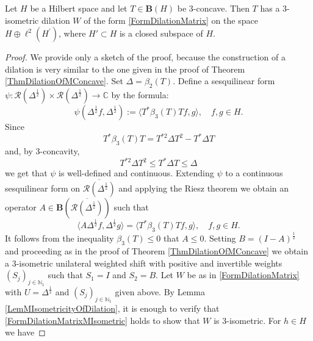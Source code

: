 \documentclass[10pt,a4paper]{amsart}
\renewcommand{\le}{\leqslant}
\begin{document}
\begin{theorem}
    \label{ThmDilationOf3ConcaveWithoutExpansivity}
    Let $ H $ be a Hilbert space and let $ T\in \mathbf{B}(H) $ be $ 3 $-concave. Then $ T $ has a $ 3 $-isometric dilation $ W $ of the form \eqref{FormDilationMatrix} on the space $ H\oplus \ell^{2}(H^{\prime}) $, where $ H' \subset H $ is a closed subspace of $ H $.
\end{theorem}

\begin{proof}
    We provide only a sketch of the proof, because the construction of a dilation is very similar to the one given in the proof of Theorem \ref{ThmDilationOfMConcave}. Set $ \Delta = \beta_{2}(T) $. Define a sesquilinear form $ \psi\colon \mathcal{R}(\Delta^{\frac{1}{2}})\times \mathcal{R}(\Delta^{\frac{1}{2}}) \to \mathbb{C} $ by the formula:
    \begin{equation*}
        \psi(\Delta^{\frac{1}{2}}f,\Delta^{\frac{1}{2}}):= \langle T^{\ast}\beta_{3}(T)Tf,g\rangle, \quad f,g\in H.
    \end{equation*}
    Since
    \begin{equation*}
        T^{\ast}\beta_{3}(T)T = T^{\ast 2}\Delta T^{2} - T^{\ast}\Delta T
    \end{equation*}
    and, by 3-concavity,
    \begin{equation*}
        T^{\ast 2}\Delta T^{2} \le T^{\ast }\Delta T \le \Delta
    \end{equation*}
    we get that $ \psi $ is well-defined and continuous.  Extending $ \psi $ to a continuous sesquilinear form on $ \overline{\mathcal{R}(\Delta^{\frac{1}{2}})} $ and applying the Riesz theorem we obtain an operator $ A\in \mathbf{B}(\overline{\mathcal{R}(\Delta^{\frac{1}{2}})}) $ such that
    \begin{equation}
        \langle A\Delta^{\frac{1}{2}}f,\Delta^{\frac{1}{2}}g\rangle = \langle T^{\ast}\beta_{3}(T)Tf,g\rangle, \quad f,g\in H.
    \end{equation}
    It follows from the inequality $ \beta_{3}(T)\le 0 $ that $ A\le 0 $. Setting $ B = (I-A)^{\frac{1}{2}} $ and proceeding as in the proof of Theorem \ref{ThmDilationOfMConcave} we obtain a 3-isometric unilateral weighted shift with positive and invertible weights $ (S_{j})_{j\in \mathbb{N}_{1}} $ such that $ S_{1} = I $ and $ S_{2} = B $. Let $ W $ be as in \eqref{FormDilationMatrix} with $ U = \Delta^{\frac{1}{2}} $ and $ (S_{j})_{j\in \mathbb{N}_{1}} $ given above. By Lemma \ref{LemMIsometricityOfDilation}, it is enough to verify that \eqref{FormDilationMatrixMIsometric} holds to show that $ W $ is 3-isometric. For $ h\in H $ we have

\end{proof}
\end{document}
